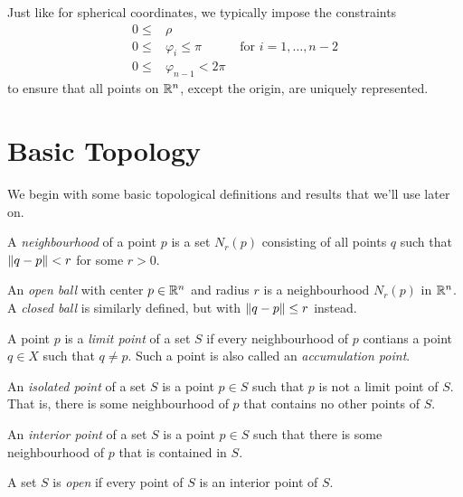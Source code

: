 \documentclass{article}
\begin{document}
Just like for spherical coordinates, we typically impose the constraints
\begin{align*}
  0 \leq  & \rho
  \\
  0  \leq & \varphi_i \leq \pi     & \text{ for $i = 1, \ldots, n - 2$}
  \\
  0  \leq & \varphi_{n - 1} < 2\pi
\end{align*}
to ensure that all points on $\mathbb{R}^n$, except the origin, are uniquely represented.

\section{Basic Topology}

We begin with some basic topological definitions and results that we'll use later on.

\begin{definition}[Neighbourhood]
  A \emph{neighbourhood} of a point $p$ is a set $N_r(p)$ consisting of all points $q$ such that $\norm{q - p} < r$ for some $r > 0$.
\end{definition}
An \emph{open ball} with center $p \in \mathbb{R}^n$ and radius $r$ is a neighbourhood $N_r(p)$ in $\mathbb{R}^n$.
A \emph{closed ball} is similarly defined, but with $\norm{q - p} \leq r$ instead.

\begin{definition}
  A point $p$ is a \emph{limit point} of a set $S$ if every neighbourhood of $p$ contians a point $q \in X$ such that $q \neq p$.
  Such a point is also called an \emph{accumulation point}.
\end{definition}

\begin{definition}
  An \emph{isolated point} of a set $S$ is a point $p \in S$ such that $p$ is not a limit point of $S$.
  That is, there is some neighbourhood of $p$ that contains no other points of $S$.
\end{definition}

\begin{definition}
  An \emph{interior point} of a set $S$ is a point $p \in S$ such that there is some neighbourhood of $p$ that is contained in $S$.
\end{definition}

\begin{definition}
  A set $S$ is \emph{open} if every point of $S$ is an interior point of $S$.
\end{definition}
\end{document}
